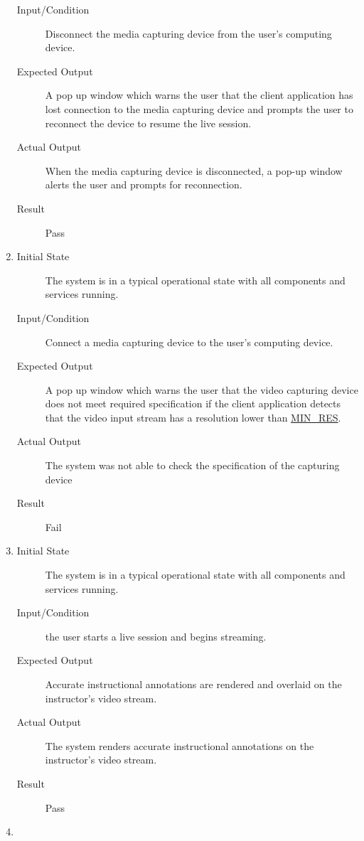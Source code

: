 \documentclass[12pt, titlepage]{article}
\begin{document}
\begin{enumerate}[NFR-T1]
\begin{description}
    \item[Input/Condition] Disconnect the media capturing device from the user’s
      computing device.
    \item[Expected Output] A pop up window which warns the user that the client
      application has lost connection to the media capturing device and prompts
      the user to reconnect the device to resume the live session.
    \item[Actual Output] When the media capturing device is disconnected, a pop-up
      window alerts the user and prompts for reconnection.
    \item[Result] Pass
    \end{description}
  \item \label{NFRT11}
    \begin{description}
    \item[Initial State] The system is in a typical operational state with all
      components and services running.
    \item[Input/Condition] Connect a media capturing device to the user’s computing
      device.
    \item[Expected Output] A pop up window which warns the user that the video
      capturing device does not meet required specification if the client
      application detects that the video input stream has a resolution lower
      than \hyperref[const:res]{MIN\_RES}.
    \item[Actual Output] The system was not able to check the specification of the
      capturing device
    \item[Result] Fail
    \end{description}
  \item \label{NFRT12}
    \begin{description}
    \item[Initial State] The system is in a typical operational state with all
      components and services running.
    \item[Input/Condition] the user starts a live session and begins streaming.
    \item[Expected Output] Accurate instructional annotations are rendered and
      overlaid on the instructor’s video stream.
    \item[Actual Output] The system renders accurate instructional annotations on
      the instructor’s video stream.
    \item[Result] Pass
    \end{description}
  \item \label{NFRT13}

\end{enumerate}
\end{document}
